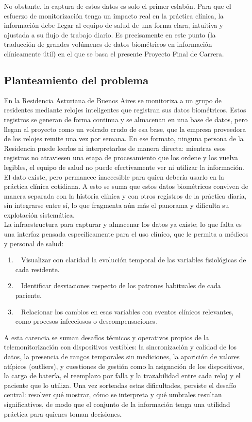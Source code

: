 No obstante, la captura de estos datos es solo el primer eslabón. Para que el esfuerzo de monitorización tenga un impacto real en la práctica clínica, la información debe llegar al equipo de salud de una forma clara, intuitiva y ajustada a su flujo de trabajo diario. Es precisamente en este punto (la traducción de grandes volúmenes de datos biométricos en información clínicamente útil) en el que se basa el presente Proyecto Final de Carrera.\\


\subsection{Planteamiento del problema}
En la Residencia Asturiana de Buenos Aires se monitoriza a un grupo de residentes mediante relojes inteligentes que registran sus datos biométricos. Estos registros se generan de forma continua y se almacenan en una base de datos, pero llegan al proyecto como un volcado crudo de esa base, que la empresa proveedora de los relojes remite una vez por semana. En ese formato, ninguna persona de la Residencia puede leerlos ni interpretarlos de manera directa: mientras esos registros no atraviesen una etapa de procesamiento que los ordene y los vuelva legibles, el equipo de salud no puede efectivamente ver ni utilizar la información. El dato existe, pero permanece inaccesible para quien debería usarlo en la práctica clínica cotidiana. A esto se suma que estos datos biométricos conviven de manera separada con la historia clínica y con otros registros de la práctica diaria, sin integrarse entre sí, lo que fragmenta aún más el panorama y dificulta su explotación sistemática.\\

La infraestructura para capturar y almacenar los datos ya existe; lo que falta es una interfaz pensada específicamente para el uso clínico, que le permita a médicos y personal de salud:\\


\begin{enumerate}
\item~ Visualizar con claridad la evolución temporal de las variables fisiológicas de cada residente.
\item~ Identificar desviaciones respecto de los patrones habituales de cada paciente.
\item~ Relacionar los cambios en esas variables con eventos clínicos relevantes, como procesos infecciosos o descompensaciones.
\end{enumerate}
A esta carencia se suman desafíos técnicos y operativos propios de la telemonitorización con dispositivos vestibles: la sincronización y calidad de los datos, la presencia de rangos temporales sin mediciones, la aparición de valores atípicos (outliers), y cuestiones de gestión como la asignación de los dispositivos, la carga de batería, el reemplazo por falla y la trazabilidad entre cada reloj y el paciente que lo utiliza. Una vez sorteadas estas dificultades, persiste el desafío central: resolver qué mostrar, cómo se interpreta y qué umbrales resultan significativos, de modo que el conjunto de la información tenga una utilidad práctica para quienes toman decisiones.\\

